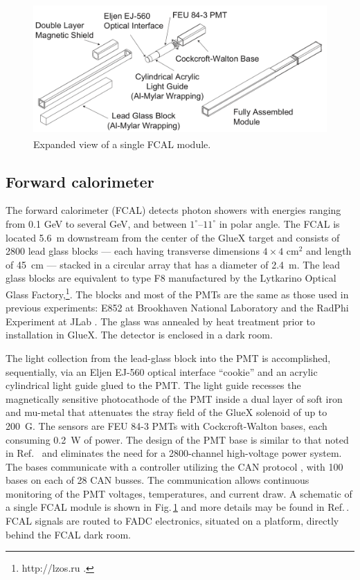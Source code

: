 \begin{figure}[tbp]\centering
\includegraphics[height=5cm]{figures/FCAL_single_module}
\caption{\label{fig:fcal:FCAL_single_module}
    Expanded view of a single FCAL module.
  }
\end{figure} 
\subsection{Forward calorimeter \label{sec:fcal}}
The forward calorimeter (FCAL) detects photon showers with energies ranging from 0.1 GeV to several GeV, and  between $1^{\circ}$--$11^{\circ}$ in polar angle. The FCAL is located 5.6~m downstream from the center of the GlueX target and consists of 2800 lead glass blocks --- each having transverse dimensions $4\times4$ cm$^2$ and length of 45~cm ---  stacked in a circular array that has a diameter of 2.4~m.  The lead glass blocks are equivalent to type F8 manufactured by the Lytkarino Optical Glass Factory,\footnote{http://lzos.ru .}. The blocks and most of the PMTs are the same as those used in previous experiments: E852 at Brookhaven National Laboratory \cite{CRITTENDEN1997377} and the RadPhi Experiment at JLab \cite{JONES2007384}. The glass was annealed by heat treatment prior to installation in GlueX. The detector is enclosed in a dark room.

The light collection from the lead-glass block into the PMT is accomplished, sequentially, via an Eljen EJ-560 optical interface ``cookie'' and an acrylic cylindrical light guide glued to the PMT. The light guide recesses the magnetically sensitive photocathode of the PMT inside a dual layer of soft iron and mu-metal that attenuates the stray field of the GlueX solenoid of up to 200~G. The sensors are FEU 84-3 PMTs with Cockcroft-Walton bases, each consuming 0.2~W of power.  The design of the PMT base is similar to that noted in Ref.~\cite{Brunner:1998fh} and eliminates the need for a 2800-channel high-voltage power system. The bases communicate with a controller utilizing the CAN protocol \cite{wiki:CANBus}, with 100 bases on each of 28 CAN busses.  The communication allows continuous monitoring of the PMT voltages, temperatures, and current draw.
A schematic of a single FCAL module is shown in 
Fig.\,\ref{fig:fcal:FCAL_single_module} and more details may be found in Ref.\,\cite{MORIYA201360}. FCAL signals are routed to FADC electronics, situated on a platform, directly behind the FCAL dark room.


